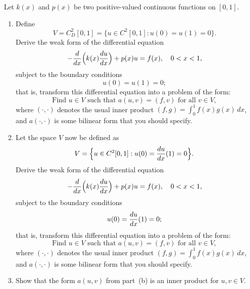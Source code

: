 
Let $k(x)$ and $p(x)$ be two positive-valued continuous functions on $[0,1]$.  
\begin{enumerate}
\item Define
\[ V = C^2_D[0,1] = \Big\{ u\in C^2[0,1]: u(0) = u(1) = 0 \Big\}.\]
 Derive the weak form of the differential equation
\[ -{d\over dx} \Big(k(x) {du \over dx}\Big) + p(x) u = f(x), 
    \quad 0 < x< 1,\]
subject to the boundary conditions
\[  u(0) = u(1) = 0;\]
that is, transform this differential equation into a problem of the form:
\[\mbox{Find $u \in V$ such that $a(u,v) = (f,v)$ for all $v\in V$},\]
where $(\cdot,\cdot)$ denotes the usual inner product
$(f, g) = \int_0^1 f(x) g(x)\, dx$,
and $a(\cdot, \cdot)$ is some bilinear form that you should specify.  
\item Let the space $V$ now be defined as
\[ V = \Big\{ u\in C^2[0,1]: u(0) = {du\over dx}(1) = 0 \Big\}.\]
Derive the weak form of the differential equation
\[ -{d\over dx} \Big(k(x) {du \over dx}\Big) + p(x) u = f(x), 
    \quad 0 < x< 1,\]
subject to the boundary conditions
\[  u(0) = {du\over dx}(1) = 0;\]
that is, transform this differential equation into a problem of the form:
\[\mbox{Find $u \in V$ such that $a(u,v) = (f,v)$ for all $v\in V$},\]
where $(\cdot,\cdot)$ denotes the usual inner product
$(f, g) = \int_0^1 f(x) g(x)\, dx$,
and $a(\cdot, \cdot)$ is some bilinear form that you should specify.

\item Show that the form $a(u,v)$ from part~(b) is an inner product
      for $u, v \in V$.
\end{enumerate}

